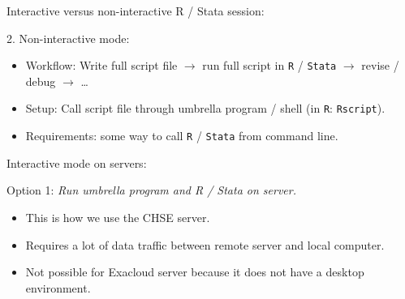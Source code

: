 \documentclass[12pt,t,xcolor=table]{beamer}
\begin{document}
\begin{frame}[fragile,label={sec:orgheadline14}]{Interactive versus non-interactive R / Stata session:}
 \begin{block}{2. Non-interactive mode:}
\begin{itemize}
\item Workflow: Write full script file \(\rightarrow\) run full script in \texttt{R} / \texttt{Stata} \(\rightarrow\) revise / debug \(\rightarrow\) \ldots{} \setlength\itemsep{0.5em}

\item Setup: Call script file through umbrella program / shell (in \texttt{R}: \texttt{Rscript}).

\item Requirements: some way to call \texttt{R} / \texttt{Stata} from command line.
\end{itemize}
\end{block}
\end{frame}

\begin{frame}[label={sec:orgheadline15}]{Interactive mode on servers:}
\begin{block}{Option 1:}
\emph{Run umbrella program and R / Stata on server.}

\begin{itemize}
\item This is how we use the CHSE server.\setlength\itemsep{0.5em}

\item Requires a lot of data traffic between remote server and local computer.

\item Not possible for Exacloud server because it does not have a desktop environment.
\end{itemize}
\end{block}
\end{frame}
\end{document}
